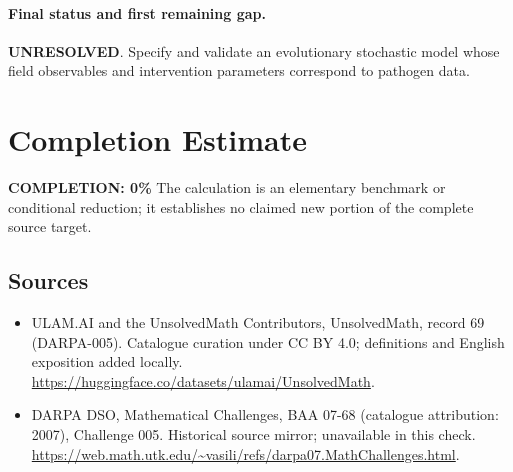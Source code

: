 \documentclass[11pt]{article}
\begin{document}
\paragraph{Final status and first remaining gap.}
\textbf{UNRESOLVED}. Specify and validate an evolutionary stochastic model whose field observables and intervention parameters correspond to pathogen data.

\section{Completion Estimate}
\noindent\textbf{COMPLETION: 0\%}
The calculation is an elementary benchmark or conditional reduction; it establishes no claimed new portion of the complete source target.

\subsection{Sources}
\begin{itemize}
\item[\hypertarget{source:69:1}{S1}] ULAM.AI and the UnsolvedMath Contributors, UnsolvedMath, record 69 (DARPA-005). Catalogue curation under CC BY 4.0; definitions and English exposition added locally.
\url{https://huggingface.co/datasets/ulamai/UnsolvedMath}.
\item[\hypertarget{source:69:2}{S2}] DARPA DSO, Mathematical Challenges, BAA 07-68 (catalogue attribution: 2007), Challenge 005. Historical source mirror; unavailable in this check.
\url{https://web.math.utk.edu/~vasili/refs/darpa07.MathChallenges.html}.
\end{itemize}
\label{end:69}
\end{document}
